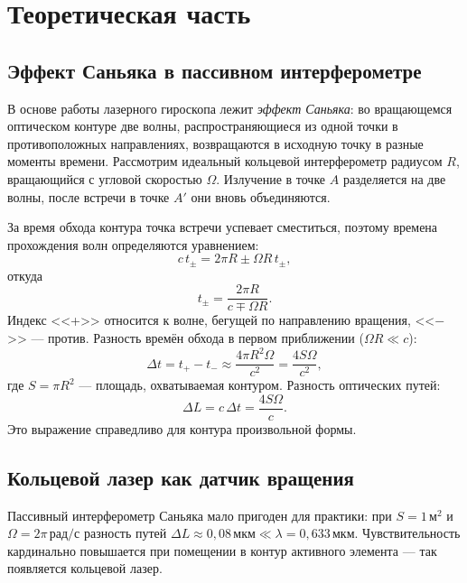 \documentclass[12pt, a4paper]{article}
\newcommand{\unit}[1]{\text{#1}}
\begin{document}
\newpage





\section*{Теоретическая часть}


\subsection*{Эффект Саньяка в пассивном интерферометре}
В основе работы лазерного гироскопа лежит \textit{эффект Саньяка}: во вращающемся оптическом контуре две волны, распространяющиеся из одной точки в противоположных направлениях, возвращаются в исходную точку в разные моменты времени. Рассмотрим идеальный кольцевой интерферометр радиусом $R$, вращающийся с угловой скоростью $\Omega$. Излучение в точке $A$ разделяется на две волны, после встречи в точке $A'$ они вновь объединяются.

За время обхода контура точка встречи успевает сместиться, поэтому времена прохождения волн определяются уравнением:
\begin{equation}
    c\, t_{\pm} = 2\pi R \pm \Omega R\, t_{\pm},
\end{equation}
откуда
\begin{equation}
    t_{\pm} = \frac{2\pi R}{c \mp \Omega R}.
\end{equation}
Индекс <<+>> относится к волне, бегущей по направлению вращения, <<$-$>> --- против. Разность времён обхода в первом приближении ($\Omega R \ll c$):
\begin{equation}
    \Delta t = t_{+} - t_{-} \approx \frac{4\pi R^2 \Omega}{c^2} = \frac{4S\Omega}{c^2},
\end{equation}
где $S = \pi R^2$ --- площадь, охватываемая контуром. Разность оптических путей:
\begin{equation}
    \Delta L = c\,\Delta t = \frac{4S\Omega}{c}.
\end{equation}
Это выражение справедливо для контура произвольной формы.



\subsection*{Кольцевой лазер как датчик вращения}
Пассивный интерферометр Саньяка мало пригоден для практики: при $S = 1\,\unit{м}^2$ и $\Omega = 2\pi\,\unit{рад/с}$ разность путей $\Delta L \approx 0{,}08\,\unit{мкм} \ll \lambda = 0{,}633\,\unit{мкм}$. Чувствительность кардинально повышается при помещении в контур активного элемента --- так появляется кольцевой лазер.
\end{document}
